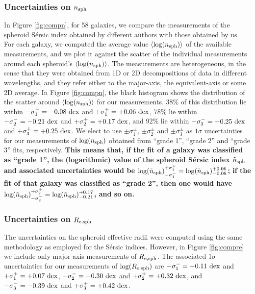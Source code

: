 \documentclass[preprint2]{emulateapj}
\begin{document}
\subsubsection{Uncertainties on $n_{\rm sph}$}
In Figure \ref{fig:compn}, for 58 galaxies, 
we compare the measurements of the spheroid S\'ersic index obtained by different authors 
with those obtained by us. 
For each galaxy, we computed the average value $\langle \log(n_{\rm sph}) \rangle$ of the available measurements, 
and we plot it against the scatter of the individual measurements around each spheroid's $\langle \log(n_{\rm sph}) \rangle$.
The measurements are heterogeneous, 
in the sense that they were obtained from 1D or 2D decompositions of data in different wavelengths, 
and they refer either to the major-axis, the equivalent-axis or some 2D average.
In Figure \ref{fig:compn}, the black histogram shows the distribution of the scatter around $\langle \log(n_{\rm sph}) \rangle$ 
for our measurements. 
38\% of this distribution lie within $-\sigma_1^- = -0.08~\rm dex$ and $+\sigma_1^+ = +0.06~\rm dex$, 
78\% lie within $-\sigma_2^- = -0.21~\rm dex$ and $+\sigma_2^+ = +0.17~\rm dex$,
and 92\% lie within $-\sigma_3^- = -0.25~\rm dex$ and $+\sigma_3^+ = +0.25~\rm dex$. 
We elect to use $\pm \sigma_1^\pm$, $\pm \sigma_2^\pm$ and $\pm \sigma_3^\pm$ as $1\sigma$ uncertainties 
for our measurements of $\log(n_{\rm sph})$ obtained from ``grade 1'', ``grade 2'' and ``grade 3'' fits, respectively. 
{\bf This means that, if the fit of a galaxy was classified as ``grade 1'', 
the (logarithmic) value of the spheroid S\'ersic index $\tilde{n}_{\rm sph}$ and associated uncertainties would be 
$\log(\tilde{n}_{\rm sph})^{+\sigma_1^+}_{-\sigma_1^-} = \log(\tilde{n}_{\rm sph})^{+0.06}_{-0.08}$; 
if the fit of that galaxy was classified as ``grade 2'', 
then one would have $\log(\tilde{n}_{\rm sph})^{+\sigma_2^+}_{-\sigma_2^-} = \log(\tilde{n}_{\rm sph})^{+0.17}_{-0.21}$, 
and so on.  } 

\subsubsection{Uncertainties on $R_{\rm e,sph}$}
The uncertainties on the spheroid effective radii were computed using the same methodology as employed for the S\'ersic indices. 
However, in Figure \ref{fig:compre} we include only major-axis measurements of $R_{\rm e,sph}$. 
The associated $1\sigma$ uncertainties for our measurements of $\log(R_{\rm e,sph})$ are 
$-\sigma_1^- = -0.11~\rm dex$ and $+\sigma_1^+ = +0.07~\rm dex$, 
$-\sigma_2^- = -0.30~\rm dex$ and $+\sigma_2^+ = +0.32~\rm dex$,
and $-\sigma_3^- = -0.39~\rm dex$ and $+\sigma_3^+ = +0.42~\rm dex$. 
\end{document}
